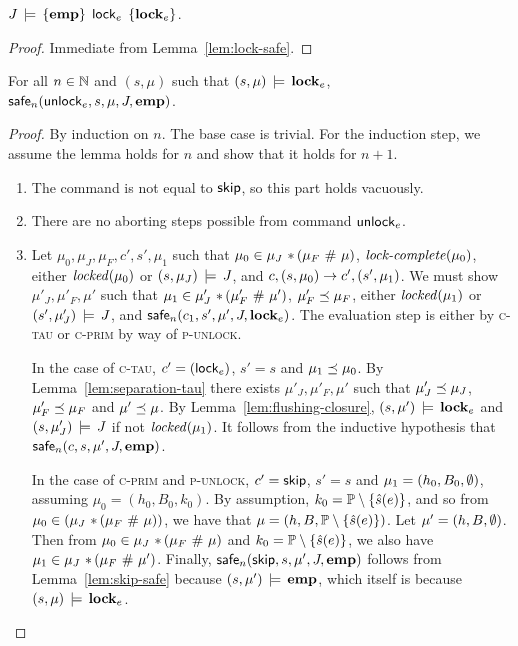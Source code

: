 \documentclass[11pt]{report}
\begin{document}
\begin{lemma}
    \label{lem:lock-sound}
    $J\,\models\,\left\lbrace \mathbf{emp} \right\rbrace\;\operatorname{\mathsf{lock}}_{e}\;\left\lbrace \mathbf{lock}_{e} \right\rbrace$. 
\end{lemma} 

\begin{proof}
    Immediate from Lemma~\ref{lem:lock-safe}. 
\end{proof}

\begin{lemma}
    \label{lem:unlock-safe}
    For all $n \in \mathbb{N}$ and $(s,\mu)$ such that $(s,\mu) \,\models\, \mathbf{lock}_{e}$, \\ $\mathsf{safe}_{n}(\operatorname{\mathsf{unlock}}_{e},s,\mu,J,\mathbf{emp})$. 
\end{lemma}

\begin{proof}
  By induction on $n$. The base case is trivial. For the induction step, we assume the lemma holds for $n$ and show that it holds for $n+1$.

    \begin{enumerate}
        \item The command is not equal to $\operatorname{\mathsf{skip}}$, so this part holds vacuously. 

        \item There are no aborting steps possible from command $\operatorname{\mathsf{unlock}}_e$. 

        \item Let $\mu_0,\mu_J,\mu_F,c',s',\mu_1$ such that $\mu_0 \in \mu_J \operatorname{\,\ast\,} (\mu_F \operatorname{\,\#\,} \mu)$, $\text{\textit{lock-complete}}(\mu_0)$, either $\mathit{locked}(\mu_0)$ or $(s,\mu_J) \,\models\, J$, and $c,(s,\mu_0) \rightarrow c',(s',\mu_1)$. We must show $\mu'_J,\mu'_F,\mu'$ such that $\mu_1 \in \mu'_J \operatorname{\,\ast\,} (\mu'_F \operatorname{\,\#\,} \mu')$, $\mu'_F \preceq \mu_F$, either $\mathit{locked}(\mu_1)$ or $(s',\mu'_J) \,\models\, J$, and $\mathsf{safe}_{n}(c_1,s',\mu',J,\mathbf{lock}_{e})$. The evaluation step is either by \textsc{c-tau} or \textsc{c-prim} by way of \textsc{p-unlock}. 

        In the case of \textsc{c-tau}, $c' = (\operatorname{\mathsf{lock}}_{e})$, $s' = s$ and $\mu_1 \preceq \mu_0$. By Lemma~\ref{lem:separation-tau} there exists $\mu'_J,\mu'_F,\mu'$ such that $\mu'_J \preceq \mu_J$, $\mu'_F \preceq \mu_F$ and $\mu' \preceq \mu$. By Lemma~\ref{lem:flushing-closure}, $(s,\mu') \,\models\, \mathbf{lock}_{e}$ and $(s,\mu'_J) \,\models\, J$ if not $\mathit{locked}(\mu_1)$. It follows from the inductive hypothesis that $\mathsf{safe}_{n}(c,s,\mu',J,\mathbf{emp})$. 

        In the case of \textsc{c-prim} and \textsc{p-unlock}, $c' = \operatorname{\mathsf{skip}}$, $s' = s$ and $\mu_1 = (h_0,B_0,\operatorname{\emptyset})$, assuming $\mu_0 = (h_0,B_0,k_0)$. By assumption, $k_0 = \mathbb{P} \setminus \left\lbrace \hat{s}(e) \right\rbrace$, and so from $\mu_0  \in (\mu_J \operatorname{\,\ast\,} (\mu_F \operatorname{\,\#\,} \mu))$, we have that $\mu = (h,B,\mathbb{P} \setminus \left\lbrace \hat{s}(e) \right\rbrace)$. Let $\mu' = (h,B,\operatorname{\emptyset})$. Then from $\mu_0 \in \mu_J \operatorname{\,\ast\,} (\mu_F \operatorname{\,\#\,} \mu)$ and $k_0 = \mathbb{P} \setminus \left\lbrace \hat{s}(e) \right\rbrace$, we also have $\mu_1 \in \mu_J \operatorname{\,\ast\,} (\mu_F \operatorname{\,\#\,} \mu')$. Finally, $\mathsf{safe}_{n}(\operatorname{\mathsf{skip}},s,\mu',J,\mathbf{emp})$ follows from Lemma~\ref{lem:skip-safe} because $(s,\mu') \,\models\, \mathbf{emp}$, which itself is because $(s,\mu) \,\models\, \mathbf{lock}_{e}$.  


\end{enumerate}
\end{proof}
\end{document}
